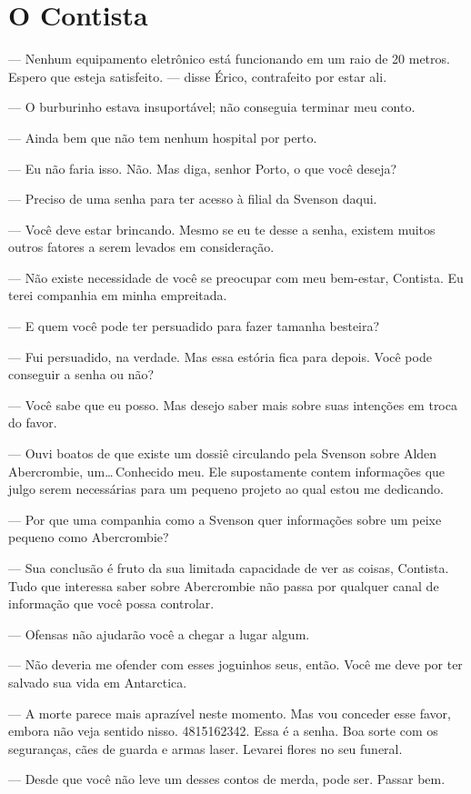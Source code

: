 \chapter{O Contista}


--- Nenhum equipamento eletrônico está funcionando em um raio de 20 metros.
Espero que esteja satisfeito. --- disse Érico, contrafeito por estar ali.

--- O burburinho estava insuportável; não conseguia terminar meu conto.

--- Ainda bem que não tem nenhum hospital por perto.

--- Eu não faria isso. Não. Mas diga, senhor Porto, o que você deseja?

--- Preciso de uma senha para ter acesso à filial da Svenson daqui.

--- Você deve estar brincando. Mesmo se eu te desse a senha, existem muitos
outros fatores a serem levados em consideração.

--- Não existe necessidade de você se preocupar com meu bem-estar, Contista. Eu
terei companhia em minha empreitada.

--- E quem você pode ter persuadido para fazer tamanha besteira?

--- Fui persuadido, na verdade. Mas essa estória fica para depois. Você pode
conseguir a senha ou não?

--- Você sabe que eu posso. Mas desejo saber mais sobre suas intenções em troca
do favor.

--- Ouvi boatos de que existe um dossiê circulando pela Svenson sobre Alden
Abercrombie, um\ldots\,Conhecido meu. Ele supostamente contem informações que
julgo serem necessárias para um pequeno projeto ao qual estou me dedicando.

--- Por que uma companhia como a Svenson quer informações sobre um peixe
pequeno como Abercrombie?

--- Sua conclusão é fruto da sua limitada capacidade de ver as coisas,
Contista. Tudo que interessa saber sobre Abercrombie não passa por qualquer
canal de informação que você possa controlar.

--- Ofensas não ajudarão você a chegar a lugar algum.

--- Não deveria me ofender com esses joguinhos seus, então. Você me deve por
ter salvado sua vida em Antarctica.

--- A morte parece mais aprazível neste momento. Mas vou conceder esse favor,
embora não veja sentido nisso. 4815162342. Essa é a senha. Boa sorte com os
seguranças, cães de guarda e armas laser. Levarei flores no seu funeral.

--- Desde que você não leve um desses contos de merda, pode ser. Passar bem.

